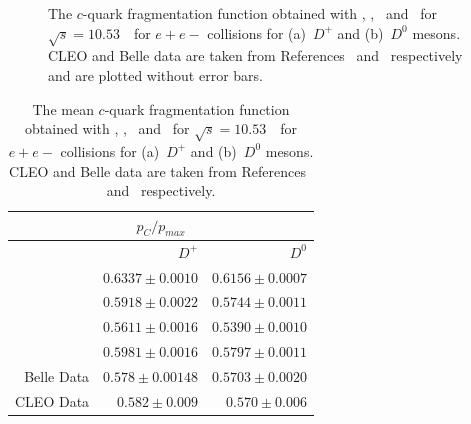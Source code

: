 \begin{figure}
\begin{subfigure}[]{0.45\textwidth}
\end{subfigure}
\caption{The $c$-quark fragmentation function obtained 
with \PythiaE, \Pythia, \Herwigpp\ and \Herwig\  
for $\sqrt{s}=10.53$~\GeV\ for $e+e-$ collisions for
(a)~$D^+$ and (b)~$D^0$ mesons. CLEO and Belle data are taken from References~\cite{CLEO} and~\cite{Belle}
respectively and are plotted without error bars. }
\label{fig:belle}
\end{figure}

\begin{table}
\begin{center}
\begin{tabular}{|r|r|r|}
\hline
\multicolumn{3}{|c|}{$p_{C}/p_{max}$} \\
\hline
& $D^+$ & $D^0$ \\
\hline
\hline
 \PythiaE & $0.6337 \pm 0.0010$ & $0.6156 \pm 0.0007$ \\
 \Pythia & $0.5918 \pm 0.0022$ & $0.5744 \pm 0.0011$ \\
 \Herwigpp & $0.5611 \pm 0.0016$ & $0.5390 \pm 0.0010$ \\
 \Herwig  & $0.5981 \pm 0.0016$ & $0.5797 \pm 0.0011$ \\
\hline
 Belle Data & $0.578 \pm 0.00148$ & $0.5703 \pm 0.0020$ \\
CLEO Data & $0.582 \pm 0.009$ & $0.570 \pm 0.006$ \\
\hline 

\hline
\end{tabular}
\caption{The mean $c$-quark fragmentation function obtained 
with \PythiaE, \Pythia, \Herwigpp\ and \Herwig\  
for $\sqrt{s}=10.53$~\GeV\ for $e+e-$ collisions for
(a)~$D^+$ and (b)~$D^0$ mesons. CLEO and Belle data are taken from References~\cite{CLEO} and~\cite{Belle}
respectively.}
\label{t:belle}
\end{center}%
\end{table}


